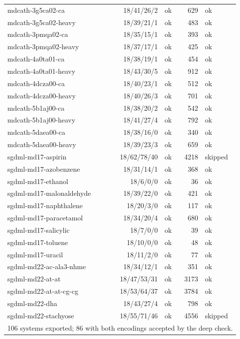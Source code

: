 \begin{small}
\begin{longtable}{lrlrl}
mdcath-3g5ca02-ca & 18/41/26/2 & ok & 629 & ok\\
mdcath-3g5ca02-heavy & 18/39/21/1 & ok & 483 & ok\\
mdcath-3pmqa02-ca & 18/35/15/1 & ok & 393 & ok\\
mdcath-3pmqa02-heavy & 18/37/17/1 & ok & 425 & ok\\
mdcath-4a0ta01-ca & 18/38/19/1 & ok & 454 & ok\\
mdcath-4a0ta01-heavy & 18/43/30/5 & ok & 912 & ok\\
mdcath-4dcza00-ca & 18/40/23/1 & ok & 512 & ok\\
mdcath-4dcza00-heavy & 18/40/26/3 & ok & 701 & ok\\
mdcath-5b1aj00-ca & 18/38/20/2 & ok & 542 & ok\\
mdcath-5b1aj00-heavy & 18/41/27/4 & ok & 792 & ok\\
mdcath-5daea00-ca & 18/38/16/0 & ok & 340 & ok\\
mdcath-5daea00-heavy & 18/39/23/3 & ok & 659 & ok\\
sgdml-md17-aspirin & 18/62/78/40 & ok & 4218 & skipped\\
sgdml-md17-azobenzene & 18/31/14/1 & ok & 368 & ok\\
sgdml-md17-ethanol & 18/6/0/0 & ok & 36 & ok\\
sgdml-md17-malonaldehyde & 18/39/22/0 & ok & 421 & ok\\
sgdml-md17-naphthalene & 18/20/3/0 & ok & 117 & ok\\
sgdml-md17-paracetamol & 18/34/20/4 & ok & 680 & ok\\
sgdml-md17-salicylic & 18/7/0/0 & ok & 39 & ok\\
sgdml-md17-toluene & 18/10/0/0 & ok & 48 & ok\\
sgdml-md17-uracil & 18/11/2/0 & ok & 77 & ok\\
sgdml-md22-ac-ala3-nhme & 18/34/12/1 & ok & 351 & ok\\
sgdml-md22-at-at & 18/47/53/31 & ok & 3173 & ok\\
sgdml-md22-at-at-cg-cg & 18/53/64/37 & ok & 3784 & ok\\
sgdml-md22-dha & 18/43/27/4 & ok & 798 & ok\\
sgdml-md22-stachyose & 18/55/71/46 & ok & 4556 & skipped\\
\midrule
\multicolumn{5}{l}{106 systems exported; 86 with both encodings accepted by the deep check.}\\
\bottomrule\end{longtable}\end{small}
